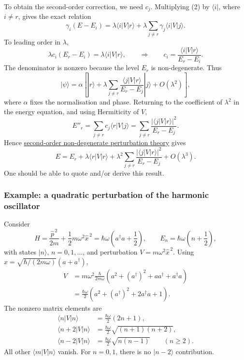 \documentclass[11pt,a4paper]{article}
\begin{document}
To obtain the second-order correction, we need $c_j$.
Multiplying (2) by $\langle i|$,
where $i\ne r$, gives the exact relation
\[
    \gamma_i(E-E_i)=\lambda\langle i|V|r\rangle
        +\lambda\sum_{j\ne r}\gamma_j\langle i|V|j\rangle.
\]
To leading order in $\lambda$,
\[
    \lambda c_i(E_r-E_i)=\lambda\langle i|V|r\rangle,
    \qquad\Longrightarrow\qquad
    c_i=\frac{\langle i|V|r\rangle}{E_r-E_i}.
\]
The denominator is nonzero because the level $E_r$ is non-degenerate.
Thus
\[
    |\psi\rangle=\alpha\left[
        |r\rangle+\lambda\sum_{j\ne r}
        \frac{\langle j|V|r\rangle}{E_r-E_j}|j\rangle
        +O(\lambda^2)\right],
\]
where $\alpha$ fixes the normalisation and phase.
Returning to the coefficient of $\lambda^2$ in the energy equation,
and using Hermiticity of $V$,
\[
    E''_r=\sum_{j\ne r}c_j\langle r|V|j\rangle
         =\sum_{j\ne r}\frac{|\langle j|V|r\rangle|^2}{E_r-E_j}.
\]
Hence \underline{second-order non-degenerate perturbation theory} gives
\[
    \boxed{
    E=E_r+\lambda\langle r|V|r\rangle
        +\lambda^2\sum_{j\ne r}
         \frac{|\langle j|V|r\rangle|^2}{E_r-E_j}
        +O(\lambda^3).
    }
\]
One should be able to quote and/or derive this result.

\subsubsection*{Example: a quadratic perturbation of the harmonic oscillator}

Consider
\[
    H=\frac{\hat p^{\,2}}{2m}+\frac12m\omega^2\hat x^{\,2}
      =\hbar\omega\left(a^\dagger a+\frac12\right),
    \qquad E_n=\hbar\omega\left(n+\frac12\right),
\]
with states $|n\rangle$, $n=0,1,\ldots$, and perturbation
$V=m\omega^2\hat x^{\,2}$. Using
$\hat x=\sqrt{\hbar/(2m\omega)}(a+a^\dagger)$,
\begin{align*}
    V&=m\omega^2\frac{\hbar}{2m\omega}
       \left(a^2+(a^\dagger)^2+aa^\dagger+a^\dagger a\right)\\
     &=\frac{\hbar\omega}{2}
       \left(a^2+(a^\dagger)^2+2a^\dagger a+1\right).
\end{align*}
The nonzero matrix elements are
\[
    \begin{aligned}
        \langle n|V|n\rangle
            &=\frac{\hbar\omega}{2}(2n+1),\\
        \langle n+2|V|n\rangle
            &=\frac{\hbar\omega}{2}\sqrt{(n+1)(n+2)},\\
        \langle n-2|V|n\rangle
            &=\frac{\hbar\omega}{2}\sqrt{n(n-1)}
              \qquad(n\ge2).
    \end{aligned}
\]
All other $\langle m|V|n\rangle$ vanish. For $n=0,1$, there is no
$|n-2\rangle$ contribution.
\end{document}
